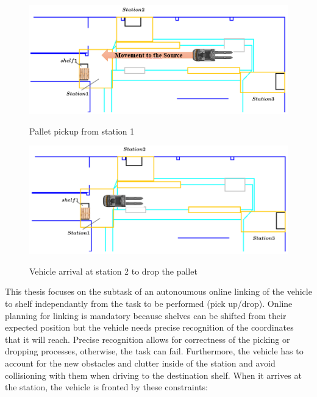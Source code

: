 \begin{figure}[H]
    \begin{center}
       \includegraphics[width=5in]{images/Chap0/move.png}\\
       \caption{Pallet pickup from station 1}
       \label{move}
       \end{center}
\end{figure}

\begin{figure}[H]
    \begin{center}
       \includegraphics[width=5in]{images/Chap0/arrive.png}\\
       \caption{Vehicle arrival at station 2 to drop the pallet}
       \label{dock}
       \end{center}
\end{figure}

This thesis focuses on the subtask of an autonoumous online linking of the vehicle to shelf
independantly from the task to be performed (pick up/drop). 
Online planning for linking is mandatory because shelves can be shifted from their expected
position but the vehicle needs precise recognition of the coordinates that it will reach. 
Precise recognition allows for correctness of the picking or dropping processes, otherwise, 
the task can fail. Furthermore, the vehicle has to account for the new obstacles and clutter inside 
of the station and avoid collisioning with them when driving to the destination shelf.
When it arrives at the station, the vehicle is fronted by these constraints:

